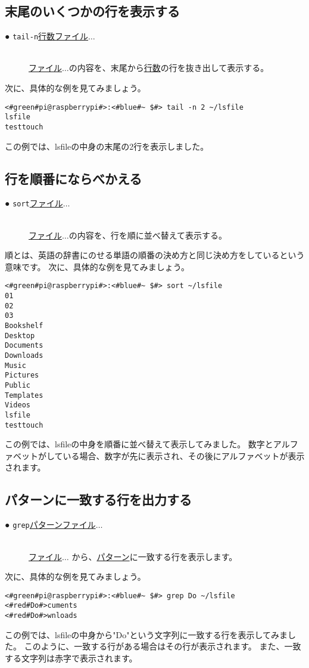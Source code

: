 \subsection{末尾のいくつかの行を表示する}
\begin{description}
    \item[● \texttt{tail}\textvisiblespace \texttt{-n}\textvisiblespace \underline{行数}\textvisiblespace \underline{ファイル}$\ldots$ ]\mbox{}\\
    \underline{ファイル}$\ldots$の内容を、末尾から\underline{行数}の行を抜き出して表示する。
\end{description}
次に、具体的な例を見てみましょう。
\begin{lstlisting}[caption=tailコマンドの実行例, label=shuf_example]
<#green#pi@raspberrypi#>:<#blue#~ $#> tail -n 2 ~/lsfile
lsfile
testtouch
\end{lstlisting}
この例では、lsfileの中身の末尾の2行を表示しました。

\subsection{行を順番にならべかえる}
\begin{description}
    \item[● \texttt{sort}\textvisiblespace \underline{ファイル}$\ldots$ ]\mbox{}\\
    \underline{ファイル}$\ldots$の内容を、行を順に並べ替えて表示する。
\end{description}
順とは、英語の辞書にのせる単語の順番の決め方と同じ決め方をしているという意味です。
次に、具体的な例を見てみましょう。
\begin{lstlisting}[caption=sortコマンドの実行例, label=sort_example]
<#green#pi@raspberrypi#>:<#blue#~ $#> sort ~/lsfile
01
02
03
Bookshelf
Desktop
Documents
Downloads
Music
Pictures
Public
Templates
Videos
lsfile
testtouch
\end{lstlisting}
この例では、lsfileの中身を順番に並べ替えて表示してみました。
数字とアルファベットがしている場合、数字が先に表示され、その後にアルファベットが表示されます。

\subsection{パターンに一致する行を出力する}
\begin{description}
    \item[● \texttt{grep}\textvisiblespace \underline{パターン}\textvisiblespace \underline{ファイル}$\ldots$ ]\mbox{}\\
    \underline{ファイル}$\ldots$ から、\underline{パターン}に一致する行を表示します。
\end{description}
次に、具体的な例を見てみましょう。
\begin{lstlisting}[caption=grepコマンドの実行例, label=grep_example]
<#green#pi@raspberrypi#>:<#blue#~ $#> grep Do ~/lsfile
<#red#Do#>cuments
<#red#Do#>wnloads
\end{lstlisting}
この例では、lsfileの中身から"Do"という文字列に一致する行を表示してみました。
このように、一致する行がある場合はその行が表示されます。
また、一致する文字列は赤字で表示されます。



